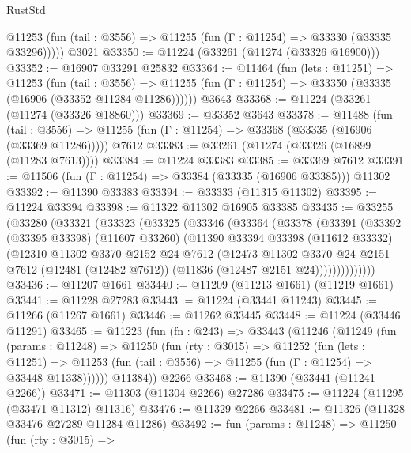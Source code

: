 \begin{lexlean}{RustStd}
\begin{coremodule}
      @11253 (fun (tail : @3556) => @11255 (fun (Γ : @11254) => @33330 (@33335 @33296)))))
    @3021
@33350 := @11224 (@33261 (@11274 (@33326 @16900)))
@33352 := @16907 @33291 @25832
@33364 := @11464
    (fun (lets : @11251) =>
    @11253
      (fun (tail : @3556) =>
      @11255 (fun (Γ : @11254) => @33350 (@33335 (@16906 (@33352 @11284 @11286))))))
    @3643
@33368 := @11224 (@33261 (@11274 (@33326 @18860)))
@33369 := @33352 @3643
@33378 := @11488
    (fun (tail : @3556) => @11255 (fun (Γ : @11254) => @33368 (@33335 (@16906 (@33369 @11286)))))
    @7612
@33383 := @33261 (@11274 (@33326 (@16899 (@11283 @7613))))
@33384 := @11224 @33383
@33385 := @33369 @7612
@33391 := @11506 (fun (Γ : @11254) => @33384 (@33335 (@16906 @33385))) @11302
@33392 := @11390 @33383
@33394 := @33333 (@11315 @11302)
@33395 := @11224 @33394
@33398 := @11322 @11302 @16905 @33385
@33435 := @33255
    (@33280
      (@33321
        (@33323
          (@33325
            (@33346
              (@33364
                (@33378
                  (@33391
                    (@33392
                      (@33395 @33398)
                      (@11607 @33260)
                      (@11390
                        @33394
                        @33398
                        (@11612 @33332)
                        (@12310
                          @11302
                          @3370
                          @2152
                          @24
                          @7612
                          (@12473
                            @11302
                            @3370
                            @24
                            @2151
                            @7612
                            (@12481 (@12482 @7612))
                            (@11836 (@12487 @2151 @24))))))))))))))
@33436 := @11207 @1661
@33440 := @11209 (@11213 @1661) (@11219 @1661)
@33441 := @11228 @27283
@33443 := @11224 (@33441 @11243)
@33445 := @11266 (@11267 @1661)
@33446 := @11262 @33445
@33448 := @11224 (@33446 @11291)
@33465 := @11223
    (fun (fn : @243) =>
    @33443
      (@11246
        (@11249
          (fun (params : @11248) =>
          @11250
            (fun (rty : @3015) =>
            @11252
              (fun (lets : @11251) =>
              @11253 (fun (tail : @3556) => @11255 (fun (Γ : @11254) => @33448 @11338))))))
        @11384))
    @2266
@33468 := @11390 (@33441 (@11241 @2266))
@33471 := @11303 (@11304 @2266) @27286
@33475 := @11224 (@11295 (@33471 @11312) @11316)
@33476 := @11329 @2266
@33481 := @11326 (@11328 @33476 @27289 @11284 @11286)
@33492 := fun (params : @11248) =>
  @11250
    (fun (rty : @3015) =>

\end{coremodule}
\end{lexlean}

